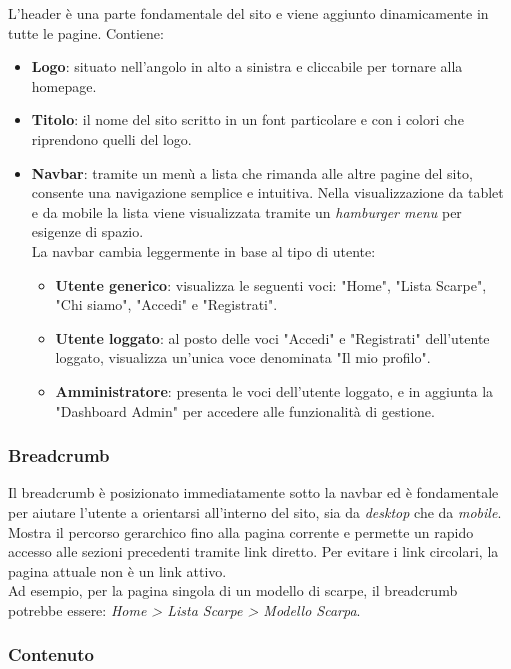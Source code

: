 \documentclass[a4paper, 12pt]{article}
\begin{document}
\begin{justify}
L'header è una parte fondamentale del sito e viene aggiunto dinamicamente in tutte le pagine. Contiene:
\begin{itemize}
    \item \textbf{Logo}: situato nell'angolo in alto a sinistra e cliccabile per tornare alla homepage.
    \item \textbf{Titolo}: il nome del sito scritto in un font particolare e con i colori che riprendono quelli del logo.
    \item \textbf{Navbar}: tramite un menù a lista che rimanda alle altre pagine del sito, consente una navigazione semplice e intuitiva. Nella visualizzazione da tablet e da mobile la lista viene visualizzata tramite un \textit{hamburger menu} per esigenze di spazio.\\
    La navbar cambia leggermente in base al tipo di utente:
        \begin{itemize}
            \item \textbf{Utente generico}: visualizza le seguenti voci: "Home", "Lista Scarpe", "Chi siamo", "Accedi" e "Registrati".
            \item \textbf{Utente loggato}: al posto delle voci "Accedi" e "Registrati" dell'utente loggato, visualizza un'unica voce denominata "Il mio profilo".
            \item \textbf{Amministratore}: presenta le voci dell'utente loggato, e in aggiunta la "Dashboard Admin" per accedere alle funzionalità di gestione.
        \end{itemize}
\end{itemize}

\subsubsection{Breadcrumb}

Il breadcrumb è posizionato immediatamente sotto la navbar ed è fondamentale per aiutare l'utente a orientarsi all'interno del sito, sia da \textit{desktop} che da \textit{mobile}. Mostra il percorso gerarchico fino alla pagina corrente e permette un rapido accesso alle sezioni precedenti tramite link diretto. Per evitare i link circolari, la pagina attuale non è un link attivo.\\ 
Ad esempio, per la pagina singola di un modello di scarpe, il breadcrumb potrebbe essere: \textit{Home > Lista Scarpe > Modello Scarpa}.

\subsubsection{Contenuto}


\end{justify}
\end{document}
